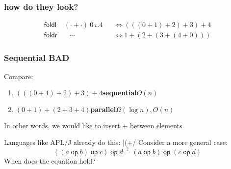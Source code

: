 \documentclass{beamer}
\DeclareMathOperator{\op}{\mathsf{op}}
\begin{document}
\begin{frame}
    \frametitle{how do they look?}
    \begin{align*}
        \mathsf{foldl} & \ (\cdot + \cdot)\ 0\ \iota.4 &  & \iff (((0 + 1) + 2) + 3) + 4 \\
        \mathsf{foldr} & \quad \cdots                  &  & \iff 1 + (2 + (3 + (4 + 0)))
    \end{align*}
    \begin{figure}[h]
        \hspace{3cm}
    \end{figure}
\end{frame}
\begin{frame}[fragile]
    \frametitle{Sequential BAD}
    Compare:
    \begin{enumerate}
        \item $(((0 + 1) + 2) + 3) + 4$\hspace{1cm}\textbf{sequential}\hfill $O(n)$
        \item $(0 + 1) + (2 + 3 + 4)$\hphantom{()}\hspace{1cm}\textbf{parallel}\hfill $\Omega(\log n), O(n)$
    \end{enumerate}
    In other words, we would like to insert $+$ between elements.

    Languages like APL/J already do this:
    |(+/ %
    Consider a more general case:
    \begin{equation*}
        ((a \op b) \op c) \op d \overset{?}{=} (a \op b) \op (c \op d)
    \end{equation*}
    When does the equation hold?
\end{frame}
\end{document}
